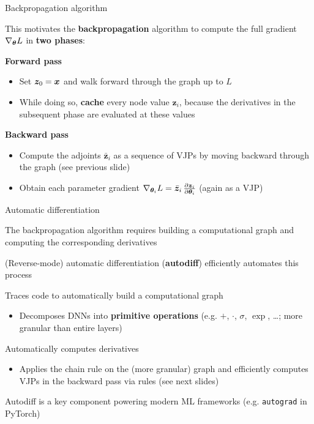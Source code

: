 \documentclass[11pt,compress,t,notes=noshow, xcolor=table]{beamer}
\newcommand{\zv}{\bm{z}}                 %
\newcommand{\adj}[1]{\bar{\bm{z}}_{#1}}  %
\begin{document}
\begin{framei}{Backpropagation algorithm}
\item This motivates the \textbf{backpropagation} algorithm to compute the full gradient $\nabla_{\bm{\theta}} L$ in \textbf{two phases}:
%
\item \textbf{Forward pass}
\begin{itemize}
  \item Set $\zv_0 = \xv$ and walk forward through the graph up to $L$ %
  \item While doing so, \textbf{cache} every node value $\zv_i$, because the derivatives in the subsequent phase are evaluated at these values
\end{itemize}
\item \textbf{Backward pass}
\begin{itemize}
\item Compute the adjoints $\adj{i}$ as a sequence of VJPs by moving backward through the graph (see previous slide)
\item Obtain each parameter gradient $\nabla_{\thetav_i} L = \adj{i} \, \pd{\zv_i}{\thetav_i}$ (again as a VJP)
\end{itemize}
\end{framei}


\begin{framei}{Automatic differentiation}
\item The backpropagation algorithm requires building a computational graph and computing the corresponding derivatives
\item (Reverse-mode) automatic differentiation (\textbf{autodiff}) efficiently automates this process
\item Traces code to automatically build a computational graph
\begin{itemize}
  \item Decomposes DNNs into \textbf{primitive operations} (e.g. $+$, $\cdot$, $\sigma$, $\exp$, \ldots; more granular than entire layers)
\end{itemize}
\item Automatically computes derivatives
\begin{itemize}
  \item Applies the chain rule on the (more granular) graph and efficiently computes VJPs in the backward pass via rules (see next slides) 
\end{itemize}
\item[$\Rightarrow$] Autodiff is a key component powering modern ML frameworks (e.g. \texttt{autograd} in PyTorch)
\end{framei}
\end{document}
